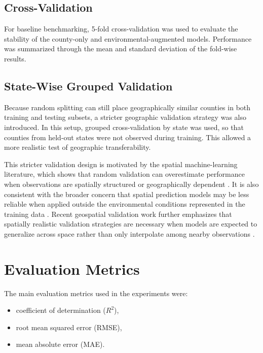 \subsection{Cross-Validation}

For baseline benchmarking, 5-fold cross-validation was used to evaluate the stability of the county-only and environmental-augmented models. Performance was summarized through the mean and standard deviation of the fold-wise results.

\subsection{State-Wise Grouped Validation}

Because random splitting can still place geographically similar counties in both training and testing subsets, a stricter geographic validation strategy was also introduced. In this setup, grouped cross-validation by state was used, so that counties from held-out states were not observed during training. This allowed a more realistic test of geographic transferability.

This stricter validation design is motivated by the spatial machine-learning literature, which shows that random validation can overestimate performance when observations are spatially structured or geographically dependent \citep{roberts2017crossvalidation,valavi2019blockcv}. It is also consistent with the broader concern that spatial prediction models may be less reliable when applied outside the environmental conditions represented in the training data \citep{meyer2021aoa}. Recent geospatial validation work further emphasizes that spatially realistic validation strategies are necessary when models are expected to generalize across space rather than only interpolate among nearby observations \citep{wang2023spatialplus}.

\section{Evaluation Metrics}

The main evaluation metrics used in the experiments were:
\begin{itemize}
    \item coefficient of determination ($R^2$),
    \item root mean squared error (RMSE),
    \item mean absolute error (MAE).
\end{itemize}

